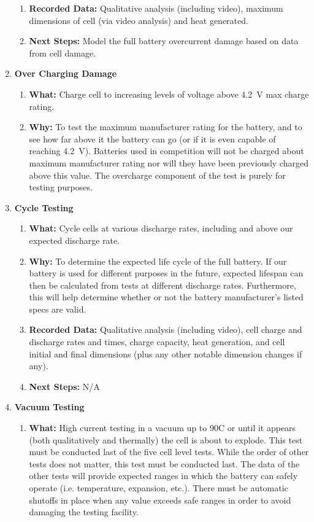 \documentclass[main.tex]{subfiles}
\begin{document}
\begin{enumerate}
\begin{enumerate}
            \item \textbf{Recorded Data: }Qualitative analysis (including video), maximum dimensions of cell (via video analysis) and heat generated.
            \item \textbf{Next Steps: }Model the full battery overcurrent damage based on data from cell damage.
        \end{enumerate}
        \item \textbf{Over Charging Damage}
        \begin{enumerate}
            \item \textbf{What: }Charge cell to increasing levels of voltage above \SI{4.2}{V} max charge rating.
            \item \textbf{Why: }To test the maximum manufacturer rating for the battery, and to see how far above it the battery can go (or if it is even capable of reaching \SI{4.2}{V}). Batteries used in competition will not be charged about maximum manufacturer rating nor will they have been previously charged above this value. The overcharge component of the test is purely for testing purposes.
        \end{enumerate}
        \item \textbf{Cycle Testing}
        \begin{enumerate}
            \item \textbf{What: }Cycle cells at various discharge rates, including and above our expected discharge rate.
            \item \textbf{Why: }To determine the expected life cycle of the full battery. If our battery is used for different purposes in the future, expected lifespan can then be calculated from tests at different discharge rates. Furthermore, this will help determine whether or not the battery manufacturer’s listed specs are valid.
            \item \textbf{Recorded Data: }Qualitative analysis (including video), cell charge and discharge rates and times, charge capacity, heat generation, and cell initial and final dimensions (plus any other notable dimension changes if any).
            \item \textbf{Next Steps: }N/A
        \end{enumerate}
        \item \textbf{Vacuum Testing}
        \begin{enumerate}
            \item \textbf{What: }High current testing in a vacuum up to 90C or until it appears (both qualitatively and thermally) the cell is about to explode. This test must be conducted last of the five cell level tests. While the order of other tests does not matter, this test must be conducted last. The data of the other tests will provide expected ranges in which the battery can safely operate (i.e. temperature, expansion, etc.). There must be automatic shutoffs in place when any value exceeds safe ranges in order to avoid damaging the testing facility.

\end{enumerate}
\end{enumerate}
\end{document}
